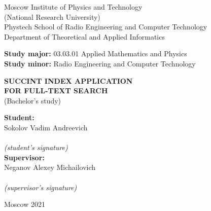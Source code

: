 \begin{center}
    Moscow Institute of Physics and Technology\\
    (National Research University)\\
    Phystech School of Radio Engineering and Computer Technology\\
    Department of Theoretical and Applied Informatics\\
\end{center}

\vspace{2mm}

\begin{flushleft}
    \textbf{Study major:} 03.03.01 Applied Mathematics and Physics\\
    \textbf{Study minor:} Radio Engineering and Computer Technology\\
\end{flushleft}

\vspace{24mm}

\begin{center}%
    \large{\textbf{SUCCINT INDEX APPLICATION\\FOR FULL-TEXT SEARCH}}\\
    (Bachelor's study)\\
\end{center}

\vspace{20mm}

\hspace{90mm}
\begin{minipage}{0.4\textwidth}
    \begin{flushleft}
        \textbf{Student:}\\Sokolov Vadim Andreevich\\
        \vspace{4mm}
        \hrulefill\\
        {\centering\scriptsize\textit{(student's signature)}\\}
        \textbf{Supervisor:}\\Neganov Alexey Michailovich\\
        \vspace{4mm}
        \hrulefill\\
        {\centering\scriptsize\textit{(supervisor's signature)}\\}
    \end{flushleft}
\end{minipage}

\vspace*{\fill}

\begin{center}
    Moscow 2021
\end{center}

\thispagestyle{empty}
